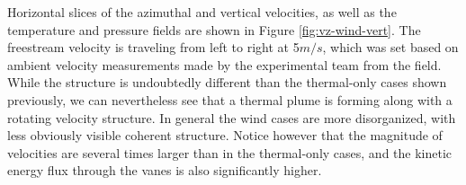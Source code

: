 

Horizontal slices of the azimuthal and vertical velocities, as well as the 
temperature and pressure fields are shown in Figure
\ref{fig:vz-wind-vert}. The freestream velocity is traveling from left
to right at 5$ m/s$, which was set based on ambient velocity
measurements made by  the experimental team from the field. While the
structure is undoubtedly different than the thermal-only cases shown
previously, we can nevertheless see that a thermal plume is forming
along with a rotating velocity structure. In general the wind cases are
more disorganized, with less obviously visible coherent
structure. Notice however that the magnitude of velocities are several
times larger than in the thermal-only cases, and the kinetic energy
flux through the vanes is also significantly higher.  

%
%





